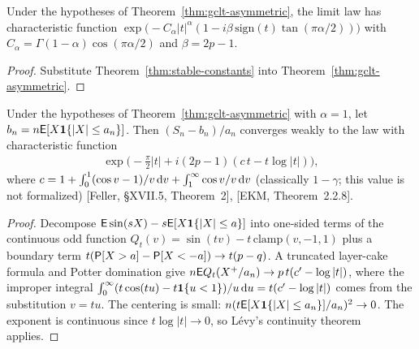 \begin{corollary}
  \label{cor:gclt-textbook}
  \leanok
  Under the hypotheses of Theorem~\ref{thm:gclt-asymmetric}, the limit law has characteristic
  function $\exp\big(-C_\alpha |t|^\alpha (1 - i \beta \, \mathrm{sign}(t) \tan(\pi\alpha/2))\big)$
  with $C_\alpha = \Gamma(1-\alpha)\cos(\pi\alpha/2)$ and $\beta = 2p - 1$.
\end{corollary}
\begin{proof}
  \leanok
  Substitute Theorem~\ref{thm:stable-constants} into Theorem~\ref{thm:gclt-asymmetric}.
\end{proof}

\begin{theorem}[Generalized central limit theorem, $\alpha = 1$]
  \label{thm:gclt-one}
  \leanok
  Under the hypotheses of Theorem~\ref{thm:gclt-asymmetric} with $\alpha = 1$, let
  $b_n = n \mathsf{E}[X \mathbf 1\{|X| \le a_n\}]$. Then $(S_n - b_n)/a_n$ converges weakly to the law with
  characteristic function
  \begin{align*}
    \exp\big( -\tfrac{\pi}{2} |t| + i (2p - 1) (c\, t - t \log |t|) \big),
  \end{align*}
  where $c = 1 + \int_0^1 (\cos v - 1)/v \, \mathrm{d} v + \int_1^\infty \cos v / v \, \mathrm{d} v$
  (classically $1 - \gamma$; this value is not formalized) [Feller, \S XVII.5, Theorem~2],
  [EKM, Theorem~2.2.8].
\end{theorem}
\begin{proof}
  \leanok
  Decompose $\mathsf{E} \sin(sX) - s \mathsf{E}[X \mathbf 1\{|X| \le a\}]$ into one-sided terms of the continuous
  odd function $Q_t(v) = \sin(tv) - t \, \mathrm{clamp}(v, -1, 1)$ plus a boundary term
  $t(\mathsf{P}[X > a] - \mathsf{P}[X < -a]) \to t(p - q)$. A truncated layer-cake formula and Potter
  domination give $n \mathsf{E} Q_t(X^+/a_n) \to p\, t (c' - \log|t|)$, where the improper integral
  $\int_0^\infty (t \cos(tu) - t \mathbf 1\{u < 1\})/u \, \mathrm{d} u = t(c' - \log |t|)$ comes from the
  substitution $v = tu$. The centering is small: $n (t \mathsf{E}[X \mathbf 1\{|X|\le a_n\}]/a_n)^2 \to 0$.
  The exponent is continuous since $t \log |t| \to 0$, so L\'evy's continuity theorem applies.
\end{proof}

